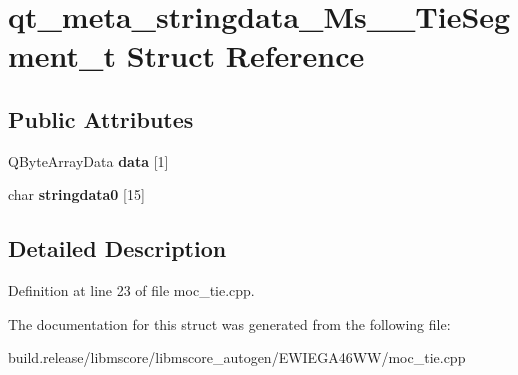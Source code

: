 \hypertarget{structqt__meta__stringdata___ms_____tie_segment__t}{}\section{qt\+\_\+meta\+\_\+stringdata\+\_\+\+Ms\+\_\+\+\_\+\+Tie\+Segment\+\_\+t Struct Reference}
\label{structqt__meta__stringdata___ms_____tie_segment__t}
\subsection*{Public Attributes}
\begin{DoxyCompactItemize}
\item 
\mbox{\label{structqt__meta__stringdata___ms_____tie_segment__t_a97e3a744c6f7cdd1c6fba2f35f4340c5}} 
Q\+Byte\+Array\+Data {\bfseries data} \mbox{[}1\mbox{]}
\item 
\mbox{\label{structqt__meta__stringdata___ms_____tie_segment__t_a36665198e32577b80df1b8024a20a78f}} 
char {\bfseries stringdata0} \mbox{[}15\mbox{]}
\end{DoxyCompactItemize}


\subsection{Detailed Description}


Definition at line 23 of file moc\+\_\+tie.\+cpp.



The documentation for this struct was generated from the following file\+:\begin{DoxyCompactItemize}
\item 
build.\+release/libmscore/libmscore\+\_\+autogen/\+E\+W\+I\+E\+G\+A46\+W\+W/moc\+\_\+tie.\+cpp\end{DoxyCompactItemize}
